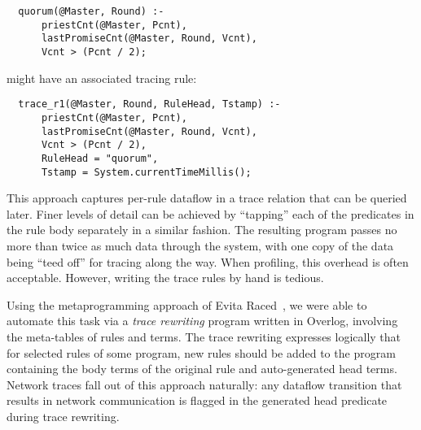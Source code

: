 {\footnotesize
\begin{verbatim}
  quorum(@Master, Round) :-
      priestCnt(@Master, Pcnt),
      lastPromiseCnt(@Master, Round, Vcnt),
      Vcnt > (Pcnt / 2);
\end{verbatim}
}
\noindent
might have an associated tracing rule:
{\footnotesize
\begin{verbatim}
  trace_r1(@Master, Round, RuleHead, Tstamp) :-
      priestCnt(@Master, Pcnt),
      lastPromiseCnt(@Master, Round, Vcnt),
      Vcnt > (Pcnt / 2),
      RuleHead = "quorum",
      Tstamp = System.currentTimeMillis();
\end{verbatim}
}
\noindent
This approach captures per-rule dataflow in a trace relation that can
be queried later.  Finer levels of detail can be achieved by
``tapping'' each of the predicates in the rule body separately in a
similar fashion.  The resulting program passes no more than twice as
much data through the system, with one copy of the data being ``teed
off'' for tracing along the way.  When profiling, this overhead is
often acceptable. However, writing the trace rules by hand is tedious.

Using the metaprogramming approach of Evita Raced~\cite{evitaraced},
we were able to automate this task via a \emph{trace rewriting} program
written in Overlog, involving the meta-tables of rules and terms.  The
trace rewriting expresses logically that for selected rules of some
program, new rules should be added to the program containing the body
terms of the original rule and auto-generated head terms. Network
traces fall out of this approach naturally: any dataflow transition
that results in network communication is flagged in the generated head
predicate during trace rewriting.


